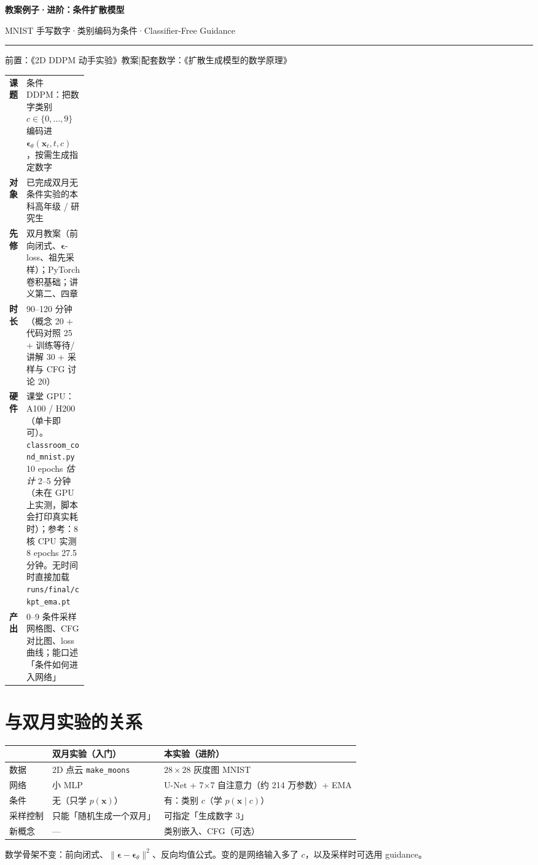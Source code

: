 \documentclass[a4paper,fontset=none,zihao=5]{ctexart}
\newcommand{\x}{\mathbf{x}}
\newcommand{\eps}{\boldsymbol{\epsilon}}
\newcommand{\epst}{\boldsymbol{\epsilon}_\theta}
\newcommand{\code}[1]{\texttt{#1}}
\newcommand{\mathnotes}{《扩散生成模型的数学原理》}
\newcommand{\moonslab}{《2D DDPM 动手实验》教案}
\begin{document}
\thispagestyle{plain}
\begin{center}
  \vspace*{0.5cm}
  {\sffamily\bfseries\fontsize{20}{28}\selectfont\color{ctitle} 教案例子·进阶：条件扩散模型\par}
  \vspace{0.35em}
  {\large\color{csub} MNIST 手写数字\enspace·\enspace 类别编码为条件\enspace·\enspace Classifier-Free Guidance\par}
  \vspace{0.35em}
  {\color{chead}\rule{0.65\textwidth}{1.5pt}\par}
  \vspace{0.15em}
  {\small\color{cmuted} 前置：\moonslab\quad|\quad 配套数学：\mathnotes\par}
\end{center}

\begin{keybox}
\small
\renewcommand{\arraystretch}{1.25}
\begin{tabularx}{\linewidth}{@{}>{\bfseries}p{0.15\linewidth}X@{}}
课题 & 条件 DDPM：把数字类别 $c\in\{0,\dots,9\}$ 编码进 $\epst(\x_t,t,c)$，按需生成指定数字 \\
对象 & 已完成双月无条件实验的本科高年级 / 研究生 \\
先修 & 双月教案（前向闭式、$\eps$-loss、祖先采样）；PyTorch 卷积基础；讲义第二、四章 \\
时长 & 90–120 分钟（概念 20 + 代码对照 25 + 训练等待/讲解 30 + 采样与 CFG 讨论 20） \\
硬件 & 课堂 GPU：A100 / H200（单卡即可）。\code{classroom\_cond\_mnist.py} 10 epochs \emph{估计} 2–5 分钟（未在 GPU 上实测，脚本会打印真实耗时）；参考：8 核 CPU 实测 8 epochs 27.5 分钟。无时间时直接加载 \code{runs/final/ckpt\_ema.pt} \\
产出 & 0–9 条件采样网格图、CFG 对比图、loss 曲线；能口述「条件如何进入网络」 \\
\end{tabularx}
\end{keybox}

\section{与双月实验的关系}
\begin{center}\small
\renewcommand{\arraystretch}{1.25}
\begin{tabularx}{\linewidth}{@{}lll@{}}
\toprule
 & 双月实验（入门） & 本实验（进阶） \\
\midrule
数据 & 2D 点云 \code{make\_moons} & $28\times28$ 灰度图 MNIST \\
网络 & 小 MLP & U-Net + 7$\times$7 自注意力（约 214 万参数）+ EMA \\
条件 & 无（只学 $p(\x)$） & 有：类别 $c$（学 $p(\x\mid c)$） \\
采样控制 & 只能「随机生成一个双月」 & 可指定「生成数字 3」 \\
新概念 & --- & 类别嵌入、CFG（可选） \\
\bottomrule
\end{tabularx}
\end{center}
数学骨架不变：前向闭式、$\|\eps-\epst\|^2$、反向均值公式。变的是网络输入多了 $c$，以及采样时可选用 guidance。
\end{document}

